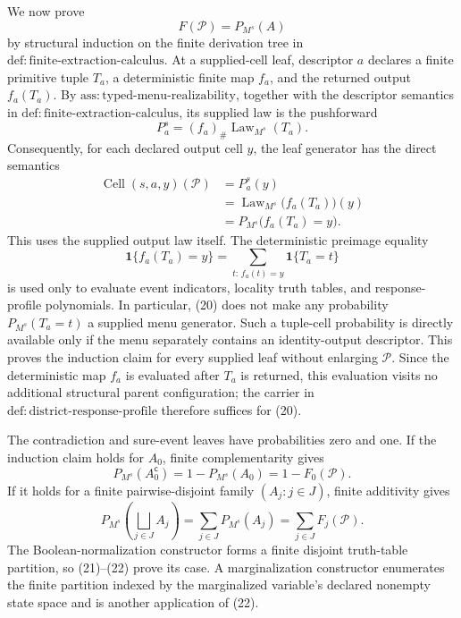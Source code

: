 We now prove
\[
 F(\mathcal P)=P_{M^s}(A)
\tag{17}
\]
by structural induction on the finite derivation tree in \(\mathrm{def:finite\text{-}extraction\text{-}calculus}\). At a supplied-cell leaf, descriptor \(a\) declares a finite primitive tuple \(T_a\), a deterministic finite map \(f_a\), and the returned output \(f_a(T_a)\). By \(\mathrm{ass:typed\text{-}menu\text{-}realizability}\), together with the descriptor semantics in \(\mathrm{def:finite\text{-}extraction\text{-}calculus}\), its supplied law is the pushforward
\[
 P_a^s=(f_a)_\#\operatorname{Law}_{M^s}(T_a).
\tag{18}
\]
Consequently, for each declared output cell \(y\), the leaf generator has the direct semantics
\[
 \begin{aligned}
 \operatorname{Cell}(s,a,y)(\mathcal P)
 &=P_a^s(y)\\
 &=\operatorname{Law}_{M^s}\!\bigl(f_a(T_a)\bigr)(y)\\
 &=P_{M^s}\!\bigl(f_a(T_a)=y\bigr).
 \end{aligned}
\tag{19}
\]
This uses the supplied output law itself. The deterministic preimage equality
\[
 \mathbf 1\{f_a(T_a)=y\}
 =\sum_{t:\,f_a(t)=y}\mathbf 1\{T_a=t\}
\tag{20}
\]
is used only to evaluate event indicators, locality truth tables, and response-profile polynomials. In particular, (20) does not make any probability \(P_{M^s}(T_a=t)\) a supplied menu generator. Such a tuple-cell probability is directly available only if the menu separately contains an identity-output descriptor. This proves the induction claim for every supplied leaf without enlarging \(\mathcal P\). Since the deterministic map \(f_a\) is evaluated after \(T_a\) is returned, this evaluation visits no additional structural parent configuration; the carrier in \(\mathrm{def:district\text{-}response\text{-}profile}\) therefore suffices for (20).

The contradiction and sure-event leaves have probabilities zero and one. If the induction claim holds for \(A_0\), finite complementarity gives
\[
 P_{M^s}(A_0^{\mathsf c})
 =1-P_{M^s}(A_0)
 =1-F_0(\mathcal P).
\tag{21}
\]
If it holds for a finite pairwise-disjoint family \((A_j:j\in J)\), finite additivity gives
\[
 P_{M^s}\!\left(\bigsqcup_{j\in J}A_j\right)
 =\sum_{j\in J}P_{M^s}(A_j)
 =\sum_{j\in J}F_j(\mathcal P).
\tag{22}
\]
The Boolean-normalization constructor forms a finite disjoint truth-table partition, so (21)--(22) prove its case. A marginalization constructor enumerates the finite partition indexed by the marginalized variable's declared nonempty state space and is another application of (22).

